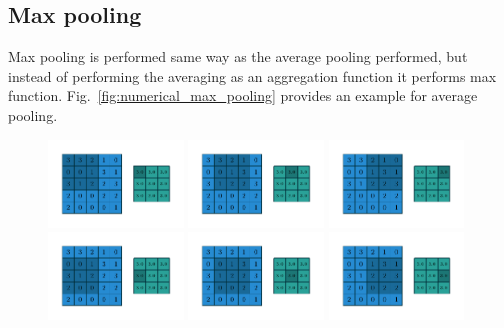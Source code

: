 \subsection{Max pooling}
Max pooling is performed same way as the average pooling performed, but instead of performing the averaging as an aggregation function it performs max function. Fig.~\ref{fig:numerical_max_pooling} provides an example for average pooling.
\begin{figure}
    \centering
    \includegraphics[width=0.32\textwidth]{pdf/numerical_max_pooling_00.pdf}
    \includegraphics[width=0.32\textwidth]{pdf/numerical_max_pooling_01.pdf}
    \includegraphics[width=0.32\textwidth]{pdf/numerical_max_pooling_02.pdf}
    \includegraphics[width=0.32\textwidth]{pdf/numerical_max_pooling_03.pdf}
    \includegraphics[width=0.32\textwidth]{pdf/numerical_max_pooling_04.pdf}
    \includegraphics[width=0.32\textwidth]{pdf/numerical_max_pooling_05.pdf}

\end{figure}
